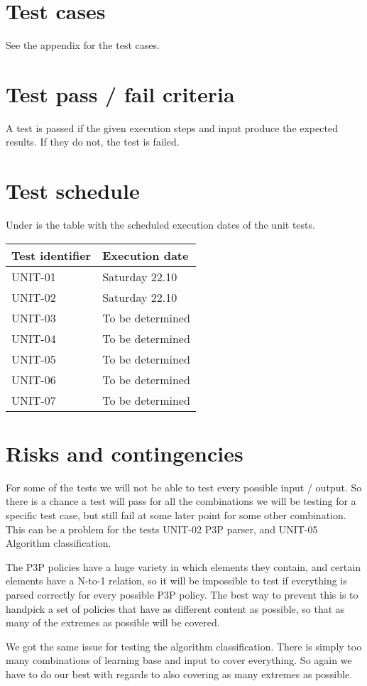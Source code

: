 	\section{Test cases}
		See the appendix for the test cases.

	\section{Test pass / fail criteria}
		A test is passed if the given execution steps and input produce the expected results. If they do not, the test is failed.

	\section {Test schedule}
		Under is the table with the scheduled execution dates of the unit tests.

		\begin{center}
			\begin{tabular}{ |  p{5cm} | p{5cm} | }
				\hline
				Test identifier & Execution date \\ [5pt] \hline \hline
				UNIT-01 & Saturday 22.10 \\  [5pt] \hline
				UNIT-02 & Saturday 22.10 \\  [5pt] \hline
				UNIT-03 & To be determined \\  [5pt] \hline
				UNIT-04 & To be determined \\  [5pt] \hline
				UNIT-05 & To be determined \\  [5pt] \hline
				UNIT-06 & To be determined \\  [5pt] \hline
				UNIT-07 & To be determined \\  [5pt] \hline
			\end{tabular}
		\end{center}

\section{Risks and contingencies}
For some of the tests we will not be able to test every possible input / output. So there is a chance a test will pass for all the combinations we will be testing for a specific test case, but still fail at some later point for some other combination. This can be a problem for the tests UNIT-02 P3P parser, and UNIT-05 Algorithm classification.

The P3P policies have a huge variety in which elements they contain, and certain elements have a N-to-1 relation, so it will be impossible to test if everything is parsed correctly for every possible P3P policy. The best way to prevent this is to handpick a set of policies that have as different content as possible, so that as many of the extremes as possible will be covered.

We got the same issue for testing the algorithm classification. There is simply too many combinations of learning base and input to cover everything. So again we have to do our best with regards to also covering as many extremes as possible.
